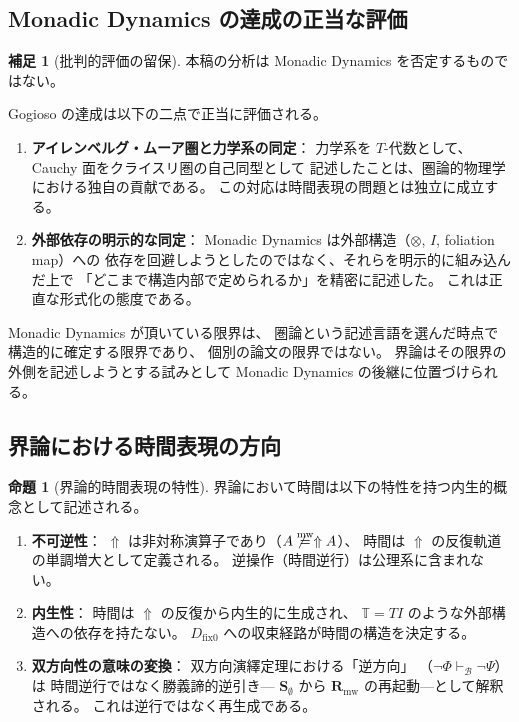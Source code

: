 \documentclass[11pt,a4paper]{ltjsarticle}
\newcommand{\mweq}{\mathrel{\overset{\mathrm{mw}}{=}}}
\newcommand{\dfix}{D_{\mathrm{fix}0}}
\newcommand{\metanegation}{\Uparrow}
\newcommand{\Rmw}{\mathbf{R}_{\mathrm{mw}}}
\newcommand{\Svoid}{\mathbf{S}_{\emptyset}}
\newcommand{\Bval}{\mathcal{B}}
\theoremstyle{definition}
\newtheorem{proposition}{命題}[section]
\newtheorem{scholium}{補足}[section]
\begin{document}
\subsection{Monadic Dynamics の達成の正当な評価}

\begin{scholium}[批判的評価の留保]
本稿の分析は Monadic Dynamics を否定するものではない。

Gogioso の達成は以下の二点で正当に評価される。

\begin{enumerate}
\item \textbf{アイレンベルグ・ムーア圏と力学系の同定}：
  力学系を $T$-代数として、Cauchy 面をクライスリ圏の自己同型として
  記述したことは、圏論的物理学における独自の貢献である。
  この対応は時間表現の問題とは独立に成立する。

\item \textbf{外部依存の明示的な同定}：
  Monadic Dynamics は外部構造（$\otimes$, $I$, foliation map）への
  依存を回避しようとしたのではなく、それらを明示的に組み込んだ上で
  「どこまで構造内部で定められるか」を精密に記述した。
  これは正直な形式化の態度である。
\end{enumerate}

Monadic Dynamics が頂いている限界は、
圏論という記述言語を選んだ時点で構造的に確定する限界であり、
個別の論文の限界ではない。
界論はその限界の外側を記述しようとする試みとして
Monadic Dynamics の後継に位置づけられる。
\end{scholium}

\subsection{界論における時間表現の方向}

\begin{proposition}[界論的時間表現の特性]
界論において時間は以下の特性を持つ内生的概念として記述される。

\begin{enumerate}
\item \textbf{不可逆性}：
  $\metanegation$ は非対称演算子であり（$A \not\mweq \metanegation A$）、
  時間は $\metanegation$ の反復軌道の単調増大として定義される。
  逆操作（時間逆行）は公理系に含まれない。

\item \textbf{内生性}：
  時間は $\metanegation$ の反復から内生的に生成され、
  $\mathbb{T} = TI$ のような外部構造への依存を持たない。
  $\dfix$ への収束経路が時間の構造を決定する。

\item \textbf{双方向性の意味の変換}：
  双方向演繹定理における「逆方向」
  （$\neg\Phi \vdash_{\Bval} \neg\Psi$）は
  時間逆行ではなく勝義諦的逆引き---
  $\Svoid$ から $\Rmw$ の再起動---として解釈される。
  これは逆行ではなく再生成である。
\end{enumerate}
\end{proposition}
\end{document}

